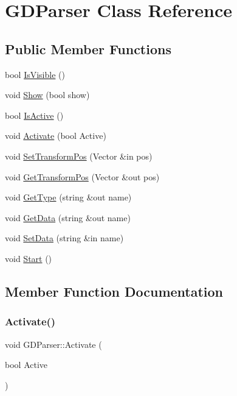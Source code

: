 \hypertarget{class_g_d_parser}{}\section{G\+D\+Parser Class Reference}
\label{class_g_d_parser}
\subsection*{Public Member Functions}
\begin{DoxyCompactItemize}
\item 
bool \hyperlink{class_g_d_parser_aeafe6c609d594420bbbcbe7187a4c065}{Is\+Visible} ()
\item 
void \hyperlink{class_g_d_parser_ad14f51ba67fa572b62d538b23cade1f4}{Show} (bool show)
\item 
bool \hyperlink{class_g_d_parser_a191331ce2bab7a6e747bf411a09603ce}{Is\+Active} ()
\item 
void \hyperlink{class_g_d_parser_affcce7fada32d2c550fd78c3a32b6b9a}{Activate} (bool Active)
\item 
void \hyperlink{class_g_d_parser_a8162fd1907d444488240ab1d8c3e7ec8}{Set\+Transform\+Pos} (Vector \&in pos)
\item 
void \hyperlink{class_g_d_parser_a40bdd548aa0ed41ad69456d3a263f7a0}{Get\+Transform\+Pos} (Vector \&out pos)
\item 
void \hyperlink{class_g_d_parser_a803f1f05d44c0765bca49b3b9aa2d2d7}{Get\+Type} (string \&out name)
\item 
void \hyperlink{class_g_d_parser_a55198dc59e266874da7dae2652c16c96}{Get\+Data} (string \&out name)
\item 
void \hyperlink{class_g_d_parser_a7a9ad8780a00456cc6e2cabb99fd6091}{Set\+Data} (string \&in name)
\item 
void \hyperlink{class_g_d_parser_a4573abef44a4d06c9773d135e07840bf}{Start} ()
\end{DoxyCompactItemize}


\subsection{Member Function Documentation}
\hypertarget{class_g_d_parser_affcce7fada32d2c550fd78c3a32b6b9a}{}\label{class_g_d_parser_affcce7fada32d2c550fd78c3a32b6b9a} 
\subsubsection{\texorpdfstring{Activate()}{Activate()}}
{\footnotesize\ttfamily void G\+D\+Parser\+::\+Activate (\begin{DoxyParamCaption}\item[{bool}]{Active }\end{DoxyParamCaption})}

